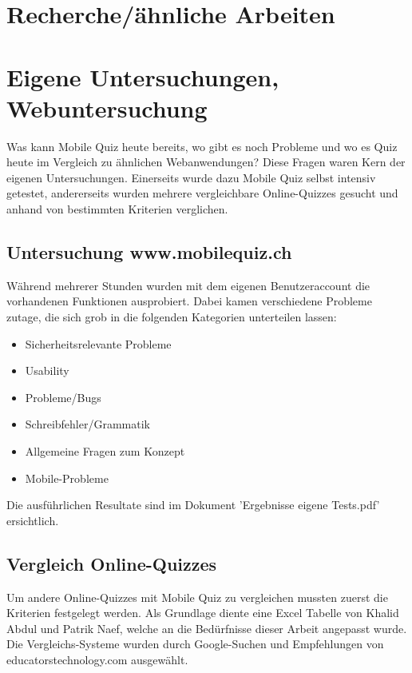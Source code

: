 \section{Recherche/ähnliche Arbeiten}


\section{Eigene Untersuchungen, Webuntersuchung}


Was kann Mobile Quiz heute bereits, wo gibt es noch Probleme und wo es Quiz heute im Vergleich zu ähnlichen Webanwendungen? Diese Fragen waren Kern der eigenen Untersuchungen. Einerseits wurde dazu Mobile Quiz selbst intensiv getestet, andererseits wurden mehrere vergleichbare Online-Quizzes gesucht und anhand von bestimmten Kriterien verglichen.


	\subsection{Untersuchung www.mobilequiz.ch}
	Während mehrerer Stunden wurden mit dem eigenen Benutzeraccount die vorhandenen Funktionen ausprobiert. Dabei kamen verschiedene Probleme zutage, die sich grob in die folgenden Kategorien unterteilen lassen:
	
	
	\begin{itemize}
		\item Sicherheitsrelevante Probleme
		\item Usability
		\item Probleme/Bugs
		\item Schreibfehler/Grammatik
		\item Allgemeine Fragen zum Konzept
		\item Mobile-Probleme
	\end{itemize}

	Die ausführlichen Resultate sind im Dokument 'Ergebnisse eigene Tests.pdf' ersichtlich.
	

	\subsection{Vergleich Online-Quizzes}
	Um andere Online-Quizzes mit Mobile Quiz zu vergleichen mussten zuerst die Kriterien festgelegt werden. Als Grundlage diente eine Excel Tabelle von Khalid Abdul und Patrik Naef, welche an die Bedürfnisse dieser Arbeit angepasst wurde.
	Die Vergleichs-Systeme wurden durch Google-Suchen und Empfehlungen von educatorstechnology.com \cite{educatorstechnology.com} ausgewählt.
	
